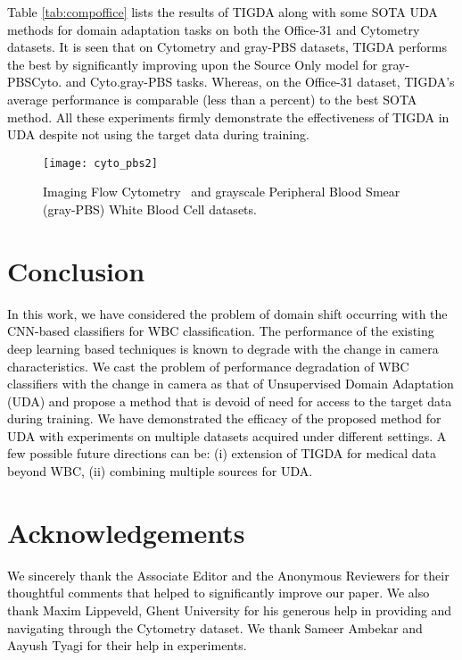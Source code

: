 \documentclass[journal,twoside,web]{IEEEtran}
\renewcommand{\textrightarrow}{}
\newcommand{\cc}{\textcolor{black}}
\newcommand{\bb}{\textcolor{black}}
\begin{document}
\bb{
Table \ref{tab:compoffice} lists the results of TIGDA along with some SOTA UDA methods for domain adaptation tasks on both the Office-31 and Cytometry datasets. It is seen that on Cytometry and gray-PBS datasets, TIGDA performs the best by significantly improving upon the Source Only model for gray-PBS\textrightarrow Cyto. and Cyto.\textrightarrow gray-PBS tasks. Whereas, on the Office-31 dataset, TIGDA's average performance is comparable (less than a percent) to the best SOTA method. All these experiments firmly demonstrate the effectiveness of TIGDA in UDA despite not using the target data during training.}
\begin{figure}[!t]
\texttt{[image: cyto\_pbs2]}
\caption{\bb{Imaging Flow Cytometry~\cite{lippeveld2019classification} and grayscale Peripheral Blood Smear (gray-PBS) White Blood Cell datasets.}}
\label{fig:cytofig}
\end{figure}


















\section{Conclusion}
\bb{In this work, we have considered the problem of domain shift occurring with the CNN-based classifiers for WBC classification. The performance of the existing \cc{deep learning} based techniques is known to degrade with the change in camera characteristics. We cast the problem of performance degradation of WBC classifiers with the change in camera as that of \cc{Unsupervised Domain Adaptation} (UDA) and propose a method that is devoid of need for access to the target data during training. We have demonstrated the efficacy of the proposed method for UDA with experiments on multiple datasets acquired under different settings. A few possible future directions can be: (i) extension of TIGDA for medical data beyond WBC, (ii) combining multiple sources for UDA.} 


\section{Acknowledgements}
\bb{We sincerely thank the Associate Editor and the Anonymous Reviewers for their thoughtful comments that helped to significantly improve our paper. We also thank Maxim Lippeveld, Ghent University for his generous help in providing and navigating through the Cytometry dataset. We thank Sameer Ambekar and Aayush Tyagi for their help in experiments.} 
\end{document}
